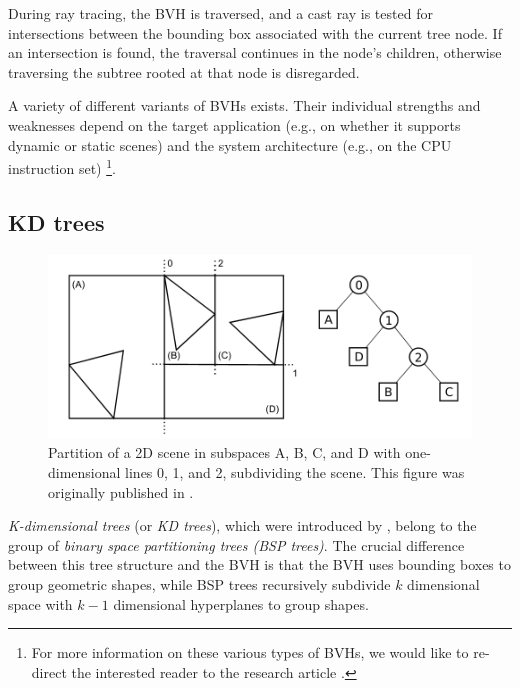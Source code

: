 During ray tracing, the BVH is traversed, and a cast ray is tested for intersections between the bounding box associated with the current tree node. If an intersection is found, the traversal continues in the node's children, otherwise traversing the subtree rooted at that node is disregarded.

A variety of different variants of BVHs exists. Their individual strengths and weaknesses depend on the target application (e.g., on whether it supports dynamic or static scenes) and the system architecture (e.g., on the CPU instruction set) \footnote{For more information on these various types of BVHs, we would like to re-direct the interested reader to the research article  \cite{meister2021survey}.}.

\subsection{KD trees}

\begin{figure}
	\centering
	\includegraphics[width=1\linewidth]{img/1 fundamentals/kd_tree.png}
	\caption{Partition of a 2D scene in subspaces A, B, C, and D with one-dimensional lines 0, 1, and 2, subdividing the scene. This figure was originally published in \cite{hapala2011kd}.}
	\label{fig:kdtree}
\end{figure}

\emph{K-dimensional trees} (or \emph{KD trees}), which were introduced by \cite{bentley1975multidimensional}, belong to the group of \emph{binary space partitioning trees (BSP trees)}.
The crucial difference between this tree structure and the BVH is that the BVH uses bounding boxes to group geometric shapes, while BSP trees recursively subdivide $k$ dimensional space with $k-1$ dimensional hyperplanes to group shapes.

